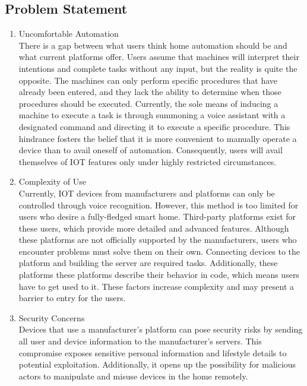 \documentclass[11pt, conference]{IEEEtran}
\begin{document}
\subsection {\large{Problem Statement}}
    \begin{enumerate}[label=\alph*]
        \item Uncomfortable Automation\\
        There is a gap between what users think home automation should be and what current platforms offer. Users assume that machines will interpret their intentions and complete tasks without any input, but the reality is quite the opposite. The machines can only perform specific procedures that have already been entered, and they lack the ability to determine when those procedures should be executed. Currently, the sole means of inducing a machine to execute a task is through summoning a voice assistant with a designated command and directing it to execute a specific procedure. This hindrance fosters the belief that it is more convenient to manually operate a device than to avail oneself of automation. Consequently, users will avail themselves of IOT features only under highly restricted circumstances.\\
        
        \item Complexity of Use\\
        Currently, IOT devices from manufacturers and platforms can only be controlled through voice recognition. However, this method is too limited for users who desire a fully-fledged smart home. Third-party platforms exist for these users, which provide more detailed and advanced features. Although these platforms are not officially supported by the manufacturers, users who encounter problems must solve them on their own. Connecting devices to the platform and building the server are required tasks. Additionally, these platforms these platforms describe their behavior in code, which means users have to get used to it. These factors increase complexity and may present a barrier to entry for the users.\\
        
        \item Security Concerns\\
        Devices that use a manufacturer's platform can pose security risks by sending all user and device information to the manufacturer's servers. This compromise exposes sensitive personal information and lifestyle details to potential exploitation. Additionally, it opens up the possibility for malicious actors to manipulate and misuse devices in the home remotely.\\
        

\end{enumerate}
\end{document}
